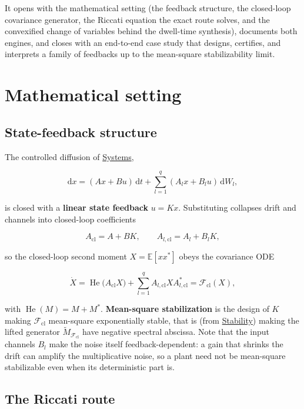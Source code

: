\documentclass[11pt,oneside]{report}
\begin{document}
It opens with the mathematical setting (the feedback structure, the closed-loop
covariance generator, the Riccati equation the exact route solves, and the
convexified change of variables behind the dwell-time synthesis), documents both
engines, and closes with an end-to-end case study that designs, certifies, and
interprets a family of feedbacks up to the mean-square stabilizability limit.

\hypertarget{mathematical-setting}{%
\section{Mathematical setting}\label{mathematical-setting}}

\hypertarget{state-feedback-structure}{%
\subsection{State-feedback structure}\label{state-feedback-structure}}

The controlled diffusion of \protect\hyperlink{chap:02-systems}{Systems},

\[\mathrm{d}x=(A x+B u)\,\mathrm{d}t+\sum_{l=1}^{q}(A_l x+B_l u)\,\mathrm{d}W_l,\]

is closed with a \textbf{linear state feedback} \(u=K x\). Substituting collapses drift
and channels into closed-loop coefficients

\[A_{\mathrm{cl}}=A+BK,\qquad A_{l,\mathrm{cl}}=A_l+B_l K,\]

so the closed-loop second moment \(X=\mathbb{E}[x x^{*}]\) obeys the covariance ODE

\[\dot X=\operatorname{He}\big(A_{\mathrm{cl}}X\big)+\sum_{l=1}^{q}A_{l,\mathrm{cl}} X A_{l,\mathrm{cl}}^{*}=\mathcal{F}_{\mathrm{cl}}(X),\]

with \(\operatorname{He}(M)=M+M^{*}\). \textbf{Mean-square stabilization} is the design
of \(K\) making \(\mathcal{F}_{\mathrm{cl}}\) mean-square exponentially stable, that
is (from \protect\hyperlink{chap:03-stability}{Stability}) making the lifted generator
\(\widetilde M_{\mathcal{F}_{\mathrm{cl}}}\) have negative spectral abscissa. Note
that the input channels \(B_l\) make the noise itself feedback-dependent: a gain
that shrinks the drift can amplify the multiplicative noise, so a plant need not
be mean-square stabilizable even when its deterministic part is.

\hypertarget{the-riccati-route}{%
\subsection{The Riccati route}\label{the-riccati-route}}
\end{document}
